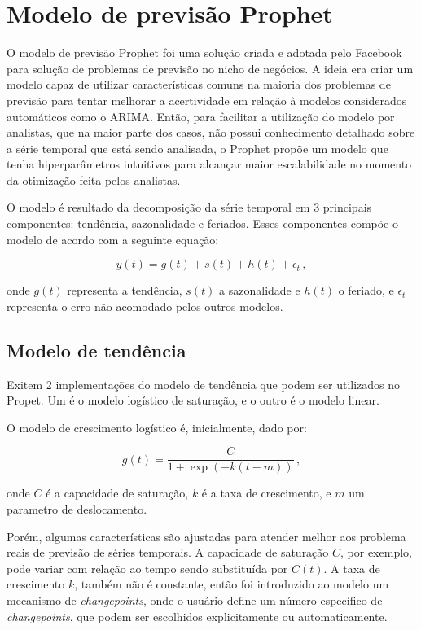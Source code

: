 \section{Modelo de previsão Prophet}
O modelo de previsão Prophet \cite{fbprophet} foi uma solução criada e adotada pelo Facebook para solução de problemas de previsão no nicho de negócios. A ideia era criar um modelo capaz de utilizar características comuns na maioria dos problemas de previsão para tentar melhorar a acertividade em relação à modelos considerados automáticos como o ARIMA. Então, para facilitar a utilização do modelo por analistas, que na maior parte dos casos, não possui conhecimento detalhado sobre a série temporal que está sendo analisada, o Prophet propõe um modelo que tenha hiperparâmetros intuitivos para alcançar maior escalabilidade no momento da otimização feita pelos analistas.

O modelo é resultado da decomposição da série temporal em 3 principais componentes: tendência, sazonalidade e feriados. Esses componentes compõe o modelo de acordo com a seguinte equação:

\begin{equation}
    y(t) = g(t) + s(t) + h(t) + \epsilon_{t}\, ,
\end{equation}

onde $g(t)$ representa a tendência, $s(t)$ a sazonalidade e $h(t)$ o feriado, e $\epsilon_{t}$ representa o erro não acomodado pelos outros modelos.

\subsection{Modelo de tendência}
Exitem 2 implementações do modelo de tendência que podem ser utilizados no Propet. Um é o modelo logístico de saturação, e o outro é o modelo linear.

O modelo de crescimento logístico é, inicialmente, dado por:

\begin{equation}
    g(t)=\frac{C}{1+\exp (-k(t-m))}\, ,
\end{equation}

onde $C$ é a capacidade de saturação, $k$ é a taxa de crescimento, e $m$ um parametro de deslocamento.

Porém, algumas características são ajustadas para atender melhor aos problema reais de previsão de séries temporais. A capacidade de saturação $C$, por exemplo, pode variar com relação ao tempo sendo substituída por $C(t)$. A taxa de crescimento $k$, também não é constante, então foi introduzido ao modelo um mecanismo de \textit{changepoints}, onde o usuário define um número específico de \textit{changepoints}, que podem ser escolhidos explicitamente ou automaticamente.

